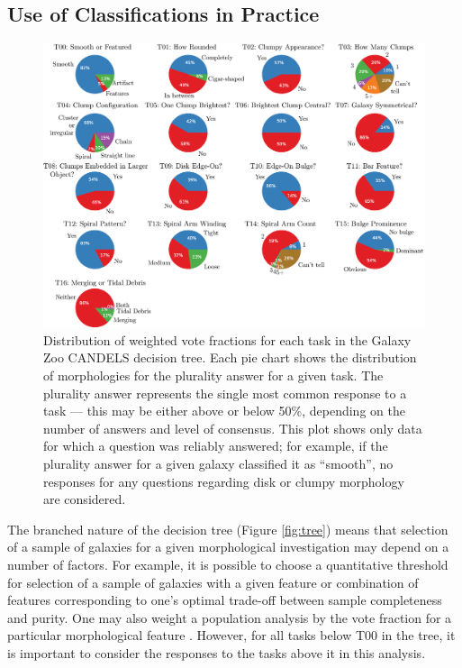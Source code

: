 \documentclass[useAMS,usenatbib]{mn2e}
\begin{document}
{\subsection{Use of Classifications in Practice}\label{sec:usage}


\begin{figure}
\includegraphics[scale=0.46]{pie_candels_mod.eps}
\caption{
Distribution of weighted vote fractions for each task in the Galaxy Zoo CANDELS decision tree. Each pie chart shows the distribution of morphologies for the plurality answer for a given task. The plurality answer represents the single most common response to a task --- this may be either above or below 50\%, depending on the number of answers and level of consensus. This plot shows only data for which a question was reliably answered; for example, if the plurality answer for a given galaxy classified it as ``smooth'', no responses for any questions regarding disk or clumpy morphology are considered. 
}
\label{fig:pie}
\end{figure}



The branched nature of the decision tree (Figure \ref{fig:tree}) means that selection of a sample of galaxies for a given morphological investigation may depend on a number of factors. For example, it is possible to choose a quantitative threshold for selection of a sample of galaxies with a given feature or combination of features corresponding to one's optimal trade-off between sample completeness and purity. One may also weight a population analysis by the vote fraction for a particular morphological feature \citep[making the assumption that the probability of a galaxy having that feature, or the strength of the feature, is a function of the vote fraction, e.g.,][]{skibba09,smethurst15}. However, for all tasks below T00 in the tree, it is important to consider the responses to the tasks above it in this analysis.

}
\end{document}
